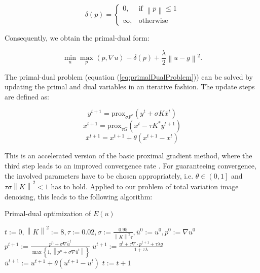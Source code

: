 \documentclass{paper}
\begin{document}
\begin{equation}
\delta(p)=\begin{cases} 0, & \mbox{if } \left\|p\right\|\leq1 \\ \infty, & \mbox{otherwise } \end{cases}
\label{eq:indicator} 
\end{equation}

Consequently, we obtain the primal-dual form:

\begin{equation}
\min_{u}\max_{p}\left\langle p,\nabla u\right\rangle-\delta(p)+\frac{\lambda}{2}\left\|u-g\right\|^{2}.
\label{eq:primalDualProblemTV} 
\end{equation}

The primal-dual problem (equation (\ref{eq:primalDualProblem})) can be solved by updating the primal and dual variables in an iterative fashion. The update steps are defined as:

\begin{equation}
y^{t+1}=\textrm{prox}_{\sigma F^{\ast}}(y^{t}+\sigma K \bar{x}^{t})
\label{eq:udpatestepDual} 
\end{equation}
\begin{equation}
x^{t+1}=\textrm{prox}_{\tau G}(x^{t}-\tau K^{\ast} y^{t+1})
\label{eq:udpatestepPrimal} 
\end{equation}
\begin{equation}
\bar{x}^{t+1} = x^{t+1} + \theta(x^{t+1}-x^{t})
\label{eq:extrapolationStep} 
\end{equation}

This is an accelerated version of the basic proximal gradient method, where the third step leads to an improved convergence rate \cite{proxalgs}. For guaranteeing convergence, the involved parameters have to be chosen appropriately, i.e. \begin{math}\theta\in\left(0,1\right]\end{math} and \begin{math}\tau\sigma\left\|K\right\|^{2}<1\end{math} has to hold. Applied to our problem of total variation image denoising, this leads to the following algorithm:

\begin{algorithm}
\caption{Primal-dual optimization of $E(u)$}
\begin{algorithmic}
 \State $t:=0,\left\|K\right\|^{2}:=8,\tau:=0.02,\sigma:=\frac{0.95}{\left\|K\right\|^{2}\tau}, \bar{u}^{0}:=u^{0}, p^{0}:=\nabla u^{0}$
   \State $p^{t+1}:=\frac{p^{n}+\sigma\nabla\bar{u}^{t}}{\max\left\{1,\left\|p^{n}+\sigma\nabla\bar{u}^{t}\right\|\right\}}$
   \State $u^{t+1}:=\frac{u^{t}+\tau\nabla\cdot p^{t+1}+\tau\lambda g}{1+\tau\lambda}$
   \State $\bar{u}^{t+1} := u^{t+1} + \theta(u^{t+1}-u^{t})$
   \State $t := t + 1$
\EndWhile
\end{algorithmic}
\end{algorithm}
\end{document}
